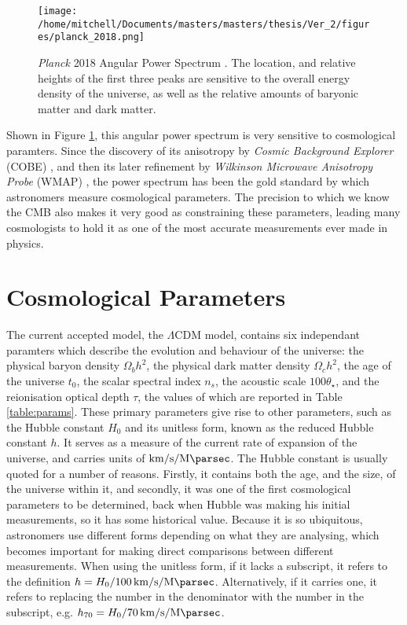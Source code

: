 \begin{figure}[h!]
\centering
\texttt{[image: /home/mitchell/Documents/masters/masters/thesis/Ver\_2/figures/planck\_2018.png]}
\caption{\emph{Planck} 2018 Angular Power Spectrum \citep{2018arXiv180706209P}. The location, and relative heights of the first three peaks are sensitive to the overall energy density of the universe, as well as the relative amounts of baryonic matter and dark matter.}
\label{fig:power_spec}
\end{figure}

Shown in Figure \ref{fig:power_spec}, this angular power spectrum is very sensitive to cosmological paramters. Since the discovery of its anisotropy by \emph{Cosmic Background Explorer} (COBE) \citep{1992PhT....45f..17L}, and then its later refinement by \textit{Wilkinson Microwave Anisotropy Probe} (WMAP) \citep{2007ApJS..170..377S}, the power spectrum has been the gold standard by which astronomers measure cosmological parameters. The precision to which we know the CMB also makes it very good as constraining these parameters, leading many cosmologists to hold it as one of the most accurate measurements ever made in physics.  

\section{Cosmological Parameters}
The current accepted model, the $\Lambda$CDM model, contains six independant paramters which describe the evolution and behaviour of the universe: the physical baryon density $\Omega_b h^2$, the physical dark matter density $\Omega_c h^2$, the age of the universe $t_0$, the scalar spectral index $n_s$, the acoustic scale $100 \theta_\star$, and the reionisation optical depth $\tau$, the values of which are reported in Table \ref{table:params}. These primary parameters give rise to other parameters, such as the Hubble constant $H_0$ and its unitless form, known as the reduced Hubble constant $h$. It serves as a measure of the current rate of expansion of the universe, and carries units of $ \SI{}{\kilo\meter\per\second\per\mega\parsec}$. The Hubble constant is usually quoted for a number of reasons. Firstly, it contains both the age, and the size, of the universe within it, and secondly, it was one of the first cosmological parameters to be determined, back when Hubble was making his initial measurements, so it has some historical value. Because it is so ubiquitous, astronomers use different forms depending on what they are analysing, which becomes important for making direct comparisons between different measurements. When using the unitless form, if it lacks a subscript, it refers to the definition $h = H_0/\SI{100}{\kilo\meter\per\second\per\mega\parsec}$. Alternatively, if it carries one, it refers to replacing the number in the denominator with the number in the subscript, e.g. $h_{70} = H_0/\SI{70}{\kilo\meter\per\second\per\mega\parsec}$.

